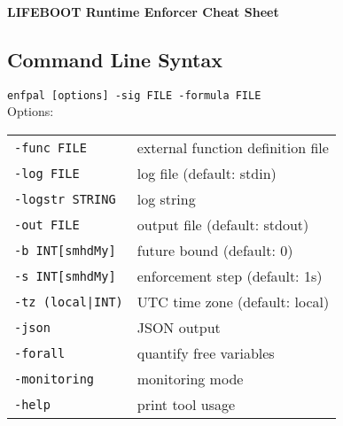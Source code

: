 \documentclass[a4paper,9pt]{extarticle}
\begin{document}
\begin{center}
    {\Large \textbf{LIFEBOOT Runtime Enforcer Cheat Sheet}}
\end{center}

\vspace{0.5em}

\begin{multicols}{2}

\section{Command Line Syntax}
\begin{tcolorbox}
  \texttt{enfpal [options] -sig FILE -formula FILE}
\\[10pt]
  Options:\\
  \begin{tabular}{ll}
    \texttt{-func FILE} & external function definition file \\
    \texttt{-log FILE} & log file (default: stdin) \\
    \texttt{-logstr STRING} & log string \\
    \texttt{-out FILE} & output file (default: stdout) \\
    \texttt{-b INT[smhdMy]} & future bound (default: 0) \\
    \texttt{-s INT[smhdMy]} & enforcement step (default: 1s) \\
    \texttt{-tz (local|INT)} & UTC time zone (default: local) \\
    \texttt{-json} & JSON output \\
    \texttt{-forall} & quantify free variables \\
    \texttt{-monitoring} & monitoring mode \\
    \texttt{-help} & print tool usage \\
  \end{tabular}
\end{tcolorbox}


\end{multicols}
\end{document}
